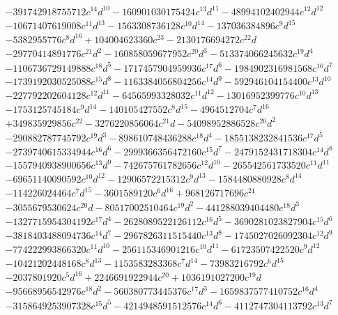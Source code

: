{\begin{align*}
&-391742918755712c^{14}d^{10}-160901030175424c^{13}d^{11}-48994102402944c^{12}d^{12}\\
&-10671407619008c^{11}d^{13}-1563308736128c^{10}d^{14}-137036384896c^{9}d^{15}\\
&-5382955776c^{8}d^{16}+104004623360c^{23}-2130176694272c^{22}d\\
&-29770414891776c^{21}d^{2}-160858059677952c^{20}d^{3}-513374066245632c^{19}d^{4}\\
&-1106736729149888c^{18}d^{5}-1717457904959936c^{17}d^{6}-1984902316981568c^{16}d^{7}\\
&-1739192030525088c^{15}d^{8}-1163384056804256c^{14}d^{9}-592946104154400c^{13}d^{10}\\
&-227792202604128c^{12}d^{11}-64565993328032c^{11}d^{12}-13016952399776c^{10}d^{13}\\
&-1753125745184c^{9}d^{14}-140105427552c^{8}d^{15}-4964512704c^{7}d^{16}\\
&+349835929856c^{22}-3276220856064c^{21}d-54098952886528c^{20}d^{2}\\
&-290882787745792c^{19}d^{3}-898610748436288c^{18}d^{4}-1855138232841536c^{17}d^{5}\\
&-2739740615334944c^{16}d^{6}-2999366356472160c^{15}d^{7}-2479152431718304c^{14}d^{8}\\
&-1557940938900656c^{13}d^{9}-742675761782656c^{12}d^{10}-265542561733520c^{11}d^{11}\\
&-69651140090592c^{10}d^{12}-12906572215312c^{9}d^{13}-1584480880928c^{8}d^{14}\\
&-114226024464c^{7}d^{15}-3601589120c^{6}d^{16}+968126717696c^{21}\\
&-3055679530624c^{20}d-80517002510464c^{19}d^{2}-441288039404480c^{18}d^{3}\\
&-1327715954304192c^{17}d^{4}-2628089522126112c^{16}d^{5}-3690281023827904c^{15}d^{6}\\
&-3818403488094736c^{14}d^{7}-2967826311515440c^{13}d^{8}-1745027026092304c^{12}d^{9}\\
&-774222993866320c^{11}d^{10}-256115346901216c^{10}d^{11}-61723507422520c^{9}d^{12}\\
&-10421202448168c^{8}d^{13}-1153583283368c^{7}d^{14}-73983216792c^{6}d^{15}\\
&-2037801920c^{5}d^{16}+2246691922944c^{20}+1036191027200c^{19}d\\
&-95668956542976c^{18}d^{2}-560380773445376c^{17}d^{3}-1659837577410752c^{16}d^{4}\\
&-3158649253907328c^{15}d^{5}-4214948591512576c^{14}d^{6}-4112747304113792c^{13}d^{7}\\

\end{align*}}
